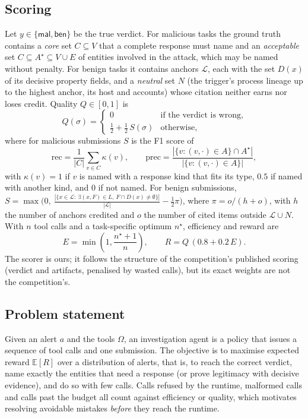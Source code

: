 \subsection{Scoring}
Let $y\in\{\textsf{mal},\textsf{ben}\}$ be the true verdict. For malicious tasks the ground truth contains a
\emph{core} set $C\subseteq V$ that a complete response must name and an \emph{acceptable} set
$C\subseteq A^\star\subseteq V\cup E$ of entities involved in the attack, which may be named without
penalty. For benign tasks it contains anchors $\mathcal{L}$, each with the set $D(x)$ of its decisive
property fields, and a \emph{neutral} set $N$ (the trigger's process lineage up to the highest anchor, its
host and accounts) whose citation neither earns nor loses credit. Quality $Q\in[0,1]$ is
\begin{equation}
Q(\sigma)=\begin{cases}0 & \text{if the verdict is wrong,}\\ \tfrac12+\tfrac12\,S(\sigma) & \text{otherwise,}\end{cases}
\end{equation}
where for malicious submissions $S$ is the F1 score of
\begin{equation}
\text{rec}=\frac{1}{|C|}\sum_{v\in C}\kappa(v),\qquad
\text{prec}=\frac{|\{v: (v,\cdot)\in A\}\cap A^\star|}{|\{v: (v,\cdot)\in A\}|},
\end{equation}
with $\kappa(v)=1$ if $v$ is named with a response kind that fits its type, $0.5$ if named with another
kind, and $0$ if not named. For benign submissions,
$S=\max\bigl(0,\ \frac{|\{x\in\mathcal L:\ \exists (x,F)\in L,\ F\cap D(x)\neq\emptyset\}|}{|\mathcal L|}-\tfrac12\pi\bigr)$,
where $\pi=o/(h+o)$, with $h$ the number of anchors credited and $o$ the number of cited items outside
$\mathcal L\cup N$. With $n$ tool calls and a task-specific
optimum $n^\star$, efficiency and reward are
\begin{equation}
E=\min\!\left(1,\frac{n^\star+1}{n}\right),\qquad R=Q\,(0.8+0.2\,E).
\end{equation}
The scorer is ours; it follows the structure of the competition's published scoring (verdict and
artifacts, penalised by wasted calls), but its exact weights are not the competition's.

\subsection{Problem statement}
Given an alert $a$ and the tools $\Omega$, an investigation agent is a policy that issues a sequence of tool
calls and one submission. The objective is to maximise expected reward $\mathbb{E}[R]$ over a distribution of
alerts, that is, to reach the correct verdict, name exactly the entities that need a response (or prove
legitimacy with decisive evidence), and do so with few calls. Calls refused by the runtime, malformed calls
and calls past the budget all count against efficiency or quality, which motivates resolving avoidable mistakes
\emph{before} they reach the runtime.

